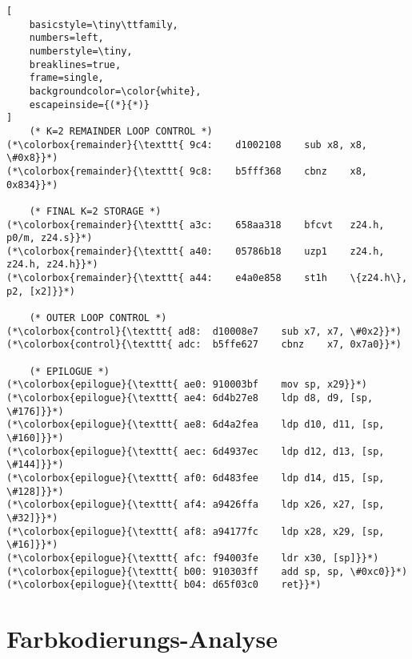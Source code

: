 \documentclass[a4paper,10pt]{article}
\begin{document}
\begin{lstlisting}[
    basicstyle=\tiny\ttfamily,
    numbers=left,
    numberstyle=\tiny,
    breaklines=true,
    frame=single,
    backgroundcolor=\color{white},
    escapeinside={(*}{*)}
]
    (* K=2 REMAINDER LOOP CONTROL *)
(*\colorbox{remainder}{\texttt{ 9c4:	d1002108 	sub	x8, x8, \#0x8}}*)
(*\colorbox{remainder}{\texttt{ 9c8:	b5fff368 	cbnz	x8, 0x834}}*)

    (* FINAL K=2 STORAGE *)
(*\colorbox{remainder}{\texttt{ a3c:	658aa318 	bfcvt	z24.h, p0/m, z24.s}}*)
(*\colorbox{remainder}{\texttt{ a40:	05786b18 	uzp1	z24.h, z24.h, z24.h}}*)
(*\colorbox{remainder}{\texttt{ a44:	e4a0e858 	st1h	\{z24.h\}, p2, [x2]}}*)

    (* OUTER LOOP CONTROL *)
(*\colorbox{control}{\texttt{ ad8:	d10008e7 	sub	x7, x7, \#0x2}}*)
(*\colorbox{control}{\texttt{ adc:	b5ffe627 	cbnz	x7, 0x7a0}}*)

    (* EPILOGUE *)
(*\colorbox{epilogue}{\texttt{ ae0:	910003bf 	mov	sp, x29}}*)
(*\colorbox{epilogue}{\texttt{ ae4:	6d4b27e8 	ldp	d8, d9, [sp, \#176]}}*)
(*\colorbox{epilogue}{\texttt{ ae8:	6d4a2fea 	ldp	d10, d11, [sp, \#160]}}*)
(*\colorbox{epilogue}{\texttt{ aec:	6d4937ec 	ldp	d12, d13, [sp, \#144]}}*)
(*\colorbox{epilogue}{\texttt{ af0:	6d483fee 	ldp	d14, d15, [sp, \#128]}}*)
(*\colorbox{epilogue}{\texttt{ af4:	a9426ffa 	ldp	x26, x27, [sp, \#32]}}*)
(*\colorbox{epilogue}{\texttt{ af8:	a94177fc 	ldp	x28, x29, [sp, \#16]}}*)
(*\colorbox{epilogue}{\texttt{ afc:	f94003fe 	ldr	x30, [sp]}}*)
(*\colorbox{epilogue}{\texttt{ b00:	910303ff 	add	sp, sp, \#0xc0}}*)
(*\colorbox{epilogue}{\texttt{ b04:	d65f03c0 	ret}}*)

\end{lstlisting}

\newpage

\section{Farbkodierungs-Analyse}
\end{document}
